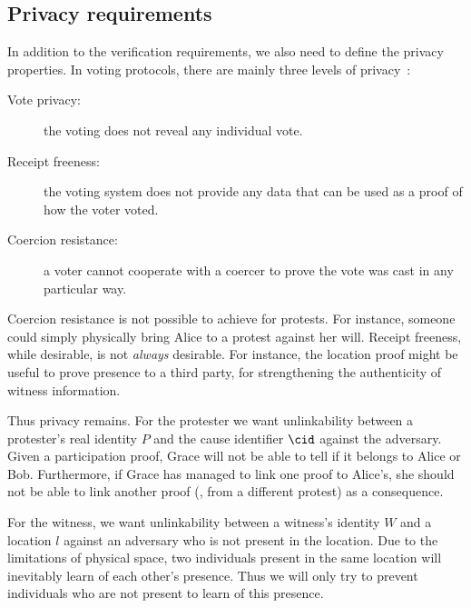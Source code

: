 \subsection{Privacy requirements}%
\label{privacy-properties}

In addition to the verification requirements, we also need to define the 
privacy properties.
In voting protocols, there are mainly three levels of 
privacy~\cite{VerifyingPrivacyPropertiesOfVotingProtocols}:
\begin{description}
  \item[Vote privacy:] the voting does not reveal any individual vote.
  \item[Receipt freeness:] the voting system does not provide any data that can 
    be used as a proof of how the voter voted.
  \item[Coercion resistance:] a voter cannot cooperate with a coercer to prove 
    the vote was cast in any particular way.
\end{description}

Coercion resistance is not possible to achieve for protests.
For instance, someone could simply physically bring Alice to a protest against 
her will.
Receipt freeness, while desirable, is not \emph{always} desirable.
For instance, the location proof might be useful to prove presence to a third 
party, \eg for strengthening the authenticity of witness information.

Thus privacy remains.
For the protester we want unlinkability between a protester's real identity 
\(P\) and the cause identifier \(\cid\) against the adversary.
Given a participation proof, Grace will not be able to tell if it belongs to 
Alice or Bob.
Furthermore, if Grace has managed to link one proof to Alice's, she should not 
be able to link another proof (\eg, from a different protest) as a consequence.

For the witness, we want unlinkability between a witness's identity \(W\) and a 
location \(l\) against an adversary who is not present in the location.
Due to the limitations of physical space, two individuals present in the same 
location will inevitably learn of each other's presence.
Thus we will only try to prevent individuals who are not present to learn of 
this presence.

